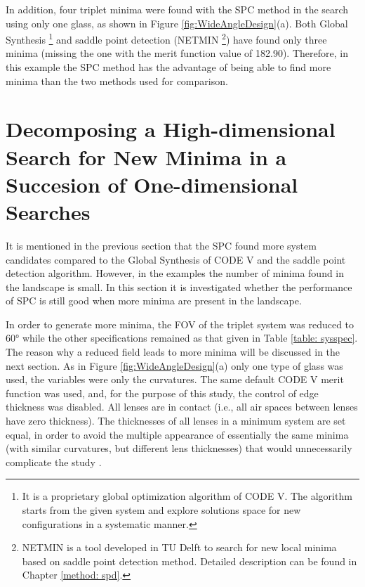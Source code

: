 In addition, four triplet minima were found with the SPC method in the search using only one glass, as shown in Figure \ref{fig:WideAngleDesign}(a). Both Global Synthesis \footnote{It is a proprietary global optimization algorithm of CODE V. The algorithm starts from the given system and explore solutions space for new configurations in a systematic manner.} and saddle point detection
(NETMIN \footnote{NETMIN is a tool developed in TU Delft to search for new local minima based on saddle point detection method. Detailed description can be found in Chapter \ref{method: spd}.}) have found only three minima (missing the one with the merit function value of 182.90). Therefore, in this example the SPC method has the advantage of being able to find more minima than the two methods used for comparison. 

\section{Decomposing a High-dimensional Search for New Minima in a Succesion of One-dimensional Searches}  \label{chrom60d}

It is mentioned in the previous section that the SPC found more system candidates compared to the Global Synthesis of CODE V and the saddle point detection algorithm. However, in the examples the number of minima found in the landscape is small. In this section it is investigated whether the performance of SPC is still good when more minima are present in the landscape.

In order to generate more minima, the FOV of the triplet system was reduced to 60° while the other specifications remained as that given in Table \ref{table: sysspec}. The reason why a reduced
field leads to more minima will be discussed in the next section.
As in Figure \ref{fig:WideAngleDesign}(a) only one type of glass was used, the variables were only the curvatures. The same default CODE V merit function was used, and, for the purpose of this study, the control of edge thickness was disabled. All lenses are in contact (i.e., all air spaces between lenses have zero thickness). The thicknesses of all lenses in a minimum system are set equal, in order to avoid the multiple appearance of essentially the same minima (with similar curvatures, but different lens thicknesses) that would unnecessarily complicate the study \cite{HouProc2015}.

